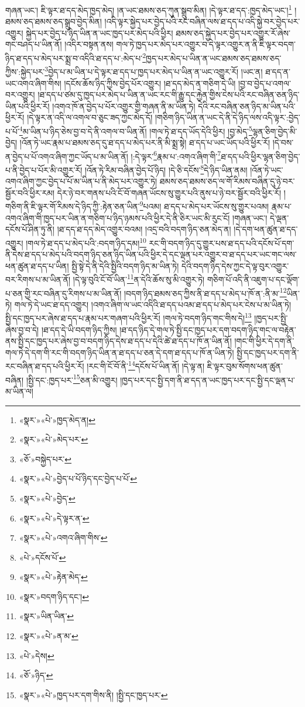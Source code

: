 གཞན་ཡང་། ཇི་ལྟར་ཐ་དད་མེད་ཁྱད་མེད། །ན་ཡང་ཐམས་ཅད་ཀུན་སྒྲུབ་མིན། །དེ་ལྟར་ཐ་དད་:ཁྱད་མེད་ཡང་།\footnote{«སྣར་»«པེ་»ཁྱད་མེད་ན།} །ཐམས་ཅད་ཐམས་ཅད་སྒྲུབ་བྱེད་མིན། །འདི་ལྟར་སྐྱེད་པར་བྱེད་པའི་རང་བཞིན་ལས་ཐ་དད་པ་འདི་སྐྱེ་བར་བྱེད་པར་འགྱུར། སྐྱེད་པར་བྱེད་པ་ཉིད་ཡིན་ན་ཡང་ཁྱད་པར་མེད་པའི་ཕྱིར། ཐམས་ཅད་སྐྱེད་པར་བྱེད་པར་འགྱུར་རོ་ཞེས་གང་བཤད་པ་ཡིན་ནོ། །འདིར་བསྟན་ནས། གལ་ཏེ་ཁྱད་པར་མེད་པར་འགྱུར་བ་དེ་ལྟར་འགྱུར་ན་ནི་ཇི་ལྟར་བདག་ཉིད་ཐ་དད་པ་མེད་པར་སྨྲ་བ་འདིའི་ཐ་དད་པ་:མེད་པ་\footnote{«སྣར་»«པེ་»མེད་པར་}ཁྱད་པར་མེད་པ་ཡིན་ན་ཡང་ཐམས་ཅད་ཐམས་ཅད་ཀྱིས་:སྐྱེད་པར་\footnote{«ཅོ་»བསྐྱེད་པར་}བྱེད་པ་མ་ཡིན་པ་དེ་ལྟར་ཐ་དད་པ་ཁྱད་པར་མེད་པ་ཡིན་ན་ཡང་འགྱུར་རོ། །ཡང་ན། ཐ་དད་ན་ཡང་འགའ་ཞིག་གིས། །དངོས་ཆོས་ཉིད་ཀྱིས་བྱེད་པོར་འགྱུར། །ཐ་དད་མེད་ན་གཅིག་དེ་ཡི། །བྱ་བ་བྱེད་པ་འགལ་བར་འགྱུར། །ཐ་དད་པ་ཙམ་དུ་ཁྱད་པར་མེད་པ་ཡིན་ན་ཡང་རང་གི་རྒྱུ་དང་རྐྱེན་གྱིས་ངེས་པའི་རང་བཞིན་ཅན་ཉིད་ཡིན་པའི་ཕྱིར་རོ། །འགའ་ཁོ་ན་བྱེད་པ་པོར་འགྱུར་གྱི་གཞན་ནི་མ་ཡིན་ཏེ། དེའི་རང་བཞིན་ཅན་ཉིད་མ་ཡིན་པའི་ཕྱིར་རོ། །དེ་ལྟར་ན་འདི་ལ་འགལ་བ་ཅུང་ཟད་ཀྱང་མེད་དོ། །གཅིག་ཉིད་ཡིན་ན་ཡང་དེ་ནི་དེ་ཉིད་ལས་འདི་ལྟར་:བྱེད་པ་པོ་\footnote{«སྣར་»«པེ་»བྱེད་པ་པོ་ཉིད་དང་བྱེད་པ་པོ་}མ་ཡིན་པ་ཉིད་ཅེས་བྱ་བ་དེ་ནི་འགལ་བ་ཡིན་ནོ། །གལ་ཏེ་ཐ་དད་ཡོད་དེའི་ཕྱིར། །བྱ་མེད་\footnote{«སྣར་»«པེ་»བྱེད་}ལྷན་ཅིག་བྱེད་མི་བྱེད། །འོན་ཏེ་ཡང་རྣམ་པ་ཐམས་ཅད་དུ་ཐ་དད་པ་མེད་པར་ནི་མི་སྨྲ་སྟེ། ཐ་དད་པ་ཡང་ཡོད་པའི་ཕྱིར་རོ། །དེ་བས་ན་བྱེད་པ་པོ་འགའ་ཞིག་ཀྱང་ཡོད་པ་མ་ཡིན་ནོ། །:དེ་ལྟར་\footnote{«སྣར་»«པེ་»དེ་ལྟར་ན་}རྣམ་པ་:འགའ་ཞིག་གི་\footnote{«སྣར་»«པེ་»འགའ་ཞིག་གིས་}ཐ་དད་པའི་ཕྱིར་ལྷན་ཅིག་བྱེད་པ་ནི་བྱེད་པ་པོར་མི་འགྱུར་རོ། །འོན་ཏེ་རིམ་བཞིན་བྱེད་པོ་ཉིད། །དེ་ཅི་དངོས་\footnote{«པེ་»དངོས་པོ་}དེ་ཉིད་ཡིན་ནམ། །འོན་ཏེ་ཡང་འགའ་ཞིག་ཀྱང་བྱེད་པ་པོ་མ་ཡིན་པ་ནི་མེད་པར་འགྱུར་ཏེ། ཐམས་ཅད་ཐམས་ཅད་ལ་གོ་རིམས་བཞིན་དུ་ཉེ་བར་སྦྱོར་བའི་ཕྱིར་རམ། དེར་ཉེ་བར་གནས་པའི་ངོ་བོ་གཞན་ཡོངས་སུ་གྱུར་པའི་ནུས་པ་ཉེ་བར་སྦྱོར་བའི་ཕྱིར་རོ། །གཅིག་ནི་ཇི་ལྟར་གོ་རིམས་དེ་ཉིད་ཀྱི་:རྟེན་ཅན་ཡིན་\footnote{«སྣར་»«པེ་»རྟེན་མེད་}པའམ། ཐ་དད་པ་མེད་པར་ཡོངས་སུ་གྱུར་པའམ། རྣམ་པ་འགའ་ཞིག་གི་ཁྱད་པར་ཡིན་ན་གཅིག་པ་ཉིད་ཉམས་པའི་ཕྱིར་དེ་ནི་ཅིར་ཡང་མི་རུང་ངོ། །གཞན་ཡང་། དེ་ལྡན་དངོས་པོ་ཤིན་ཏུ་ནི། །ཐ་དད་ཐ་དད་མེད་འགྱུར་བའམ། །འདྲ་བའི་བདག་ཉིད་ཅན་མེད་ན། །དེ་དག་ཕན་ཚུན་ཐ་དད་འགྱུར། །གལ་ཏེ་ཐ་དད་པ་མེད་པའི་:བདག་ཉིད་དམ།\footnote{«སྣར་»བདག་ཉིད་དང་།} རང་གི་བདག་ཉིད་དུ་གྱུར་པས་ཐ་དད་པའི་དངོས་པོ་དག་ནི་དེས་ཐ་དད་པ་མེད་པའི་བདག་ཉིད་ཅན་ཉིད་ཡིན་པའི་ཕྱིར་དེ་དང་ལྡན་པར་འགྱུར་བ་ཐ་དད་པར་ཡང་གང་ལས་ཕན་ཚུན་ཐ་དད་པ་ཡིན། སྤྱི་སྟེ་དེ་ནི་དེའི་སྤྱིའི་བདག་ཉིད་མ་ཡིན་ཏེ། དེའི་བདག་ཉིད་དེས་ཀྱང་དེ་ལྟ་བུར་འགྱུར་བར་རིགས་པ་མ་ཡིན་ནོ། །དེ་ལྟ་བུའི་ངོ་བོ་ཡིན་\footnote{«སྣར་»ཡིན་ཡིན་}ན་དེའི་ཆོས་སུ་མི་འགྱུར་ཏེ། གཅིག་པོ་འདི་ནི་འཇུག་པ་དང་ལྡོག་པ་ཅན་གྱི་རང་བཞིན་དུ་རིགས་པ་མ་ཡིན་ནོ། །བདག་ཉིད་ཐམས་ཅད་ཀྱིས་ནི་ཐ་དད་པ་མེད་པ་ཁོ་ན་:ནི་མ་\footnote{«སྣར་»«པེ་»ན་མ་}ཡིན་ཏེ། གལ་ཏེ་དེ་ཡང་ཐ་དད་འགྱུར། །འགའ་ཞིག་ལ་ཡང་འདིའི་ཐ་དད་པའམ་ཐ་དད་པ་མེད་པར་ངེས་པ་མ་ཡིན་ཏེ། སྤྱི་དང་ཁྱད་པར་ཞེས་ཐ་དད་པ་རྣམ་པར་གཞག་པའི་ཕྱིར་རོ། །གལ་ཏེ་བདག་ཉིད་གང་གིས་དེ།\footnote{«པེ་»དེས།} །ཁྱད་པར་སྤྱི་ཞེས་བྱ་བ་དེ། །ཐ་དད་དེ་ཡི་བདག་ཉིད་ཀྱིས། །ཐ་དད་ཉིད་དེ་གལ་ཏེ་སྤྱི་དང་ཁྱད་པར་དག་བདག་ཉིད་གང་ལ་བརྟེན་ནས་སྤྱི་དང་ཁྱད་པར་ཞེས་བྱ་བ་བདག་ཉིད་དེས་ཐ་དད་པ་དེའི་ཚེ་ཐ་དད་པ་ཁོ་ན་ཡིན་ནོ། །གང་གི་ཕྱིར་དེ་དག་ནི་གལ་ཏེ་དེ་དག་གི་རང་གི་བདག་ཉིད་ཡིན་ན་ཐ་དད་པ་ཅན་དེ་དག་ཐ་དད་པ་ཁོ་ན་ཡིན་ཏེ། སྤྱི་དང་ཁྱད་པར་དག་ནི་རང་བཞིན་ཐ་དད་པའི་ཕྱིར་རོ། །རང་གི་ངོ་བོ་ནི་\footnote{«ཅོ་»ཉིད་}དངོས་པོ་ཡིན་ནོ། །དེ་ལྟ་ན། ཇི་ལྟར་བུམ་སོགས་ཕན་ཚུན་བཞིན། །སྤྱི་དང་:ཁྱད་པར་\footnote{«སྣར་»«པེ་»ཁྱད་པར་དག་གིས་ནི། །སྤྱི་དང་ཁྱད་པར་}ཅན་མི་འགྱུར། །ཁྱད་པར་དང་སྤྱི་དག་ནི་ཐ་དད་ན་ཡང་ཁྱད་པར་དང་སྤྱི་དང་ལྡན་པ་མ་ཡིན་ལ། 